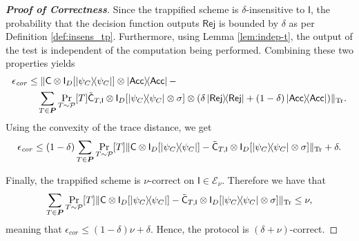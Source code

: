 \documentclass[12pt]{iopart}
\newcommand{\cptp}[1]{\mathsf{#1}} \newcommand{\pd}[1]{\mathcal{#1}}  \newcommand{\sch}[1]{\bm{#1}}
\newcommand{\Id}{\cptp{I}}
\renewcommand{\1}{\mathds{1}}
\newcommand{\acc}{\mathsf{Acc}}
\newcommand{\rej}{\mathsf{Rej}}
\newcommand{\Cdev}[1]{\tilde{\cptp C}_{T, #1}}
\begin{document}
\begin{proof}[\bf Proof of Correctness]
Since the trappified scheme is $\delta$-insensitive to $\Id$, the probability that the decision function outputs $\rej$ is bounded by $\delta$ as per Definition \ref{def:insens_tp}. Furthermore, using Lemma \ref{lem:indep-t}, the output of the test is independent of the computation being performed. Combining these two properties yields
\begin{align}
\label{eq:cor}
\begin{split}
	\epsilon_{\mathit{cor}} &\leq \| \cptp C \otimes \Id_D[\dyad{\psi_C}]\otimes\dyad{\acc} - \\
	&\quad \sum_{T\in \sch P} \Pr_{T\sim \pd P}[T]\Cdev{\Id} \otimes \Id_D[\dyad{\psi_C}\otimes\sigma]\otimes(\delta\dyad{\rej} + (1-\delta)\dyad{\acc})\|_{\Tr}.
\end{split}
\end{align}
Using the convexity of the trace distance, we get
\begin{align}
\epsilon_{\mathit{cor}}	\leq (1-\delta)\sum_{T\in \sch P} \Pr_{T\sim \pd P}[T]\| \cptp C \otimes \Id_D[\dyad{\psi_C}] - \Cdev{\Id} \otimes \Id_D[\dyad{\psi_C}\otimes\sigma]\|_{\Tr} + \delta.
\end{align}

Finally, the trappified scheme is $\nu$-correct on $\Id \in \mathcal E_\nu$. Therefore we have that
\begin{equation}
\sum_{T\in \sch P} \Pr_{T\sim \pd P}[T]\| \cptp C \otimes \Id_D[\dyad{\psi_C}] - \Cdev{\Id} \otimes \Id_D[\dyad{\psi_C}\otimes\sigma]\|_{\Tr} \leq \nu,
\end{equation}
meaning that $\epsilon_{\mathit{cor}} \leq (1-\delta)\nu + \delta$. Hence, the protocol is $(\delta+\nu)$-correct.
\end{proof}
\end{document}
